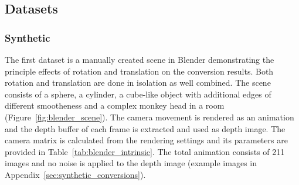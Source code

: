 \subsection{Datasets}

\subsubsection{Synthetic}\label{sec:dataset_synthetic}

The first dataset is a manually created scene in Blender\cite{blender} demonstrating the principle effects of rotation and translation on the conversion results.
Both rotation and translation are done in isolation as well combined.
The scene consists of a sphere, a cylinder, a cube-like object with additional edges of different smootheness and a complex monkey head in a room (Figure~\ref{fig:blender_scene}).
The camera movement is rendered as an animation and the depth buffer of each frame is extracted and used as depth image.
The camera matrix is calculated from the rendering settings and its parameters are provided in Table~\ref{tab:blender_intrinsic}.
The total animation consists of 211 images and no noise is applied to the depth image (example images in Appendix~\ref{sec:synthetic_conversions}).
